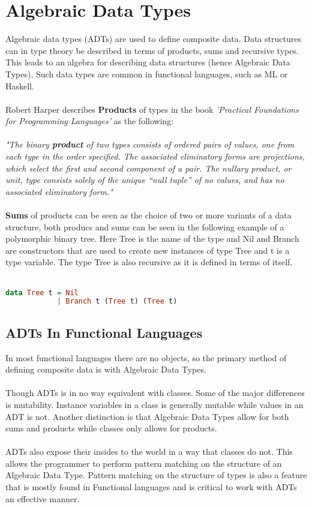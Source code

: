 \documentclass[10pt]{report}
\begin{document}
\section{Algebraic Data Types}
Algebraic data types (ADTs) are used to define composite data.  Data structures can in type theory be described in terms of products, sums and recursive types. This leads to an algebra for describing data structures (hence Algebraic Data Types). Such data types are common in functional languages, such as ML or Haskell.
\\
\\
Robert Harper describes \textbf{Products} of types in the book \textit{'Practical Foundations for Programming Languages'} as the following:
\\
\\
\textit{"The binary \textbf{product} of two types consists of ordered pairs of values, one from each type in the order specified. The associated eliminatory forms are projections, which select the first and second component of a pair. The nullary product, or unit, type consists solely of the unique “null tuple” of no values, and has no associated eliminatory form."}
\\
\\
\textbf{Sums} of products can be seen as the choice of two or more variants of a data structure, both producs and sums can be seen in the following example of a polymorphic binary tree.  Here Tree is the name of the type and Nil and Branch are constructors that are used to create new instances of type Tree and t is a type variable.  The type Tree is also recursive as it is defined in terms of itself.
\\
\\
\begin{lstlisting}[language=Haskell,caption={Binary tree definition in Haskell},label={lst:e4c_syntax}]
data Tree t = Nil
            | Branch t (Tree t) (Tree t)
\end{lstlisting}
\subsection{ADTs In Functional Languages}%
In most functional languages there are no objects, so the primary method of defining composite data is with Algebraic Data Types.
\\
\\
Though ADTs is in no way equivalent with classes. Some of the major differences is mutability. Instance variables in a class is generally mutable while values in an ADT is not. Another distinction is that Algebraic Data Types allow for both sums and products while classes only allows for products.
\\
\\
ADTs also expose their insides to the world in a way that classes do not. This allows the programmer to perform pattern matching on the structure of an Algebraic Data Type. Pattern matching on the structure of types is also a feature that is mostly found in Functional languages and is critical to work with ADTs an effective manner.
\end{document}
